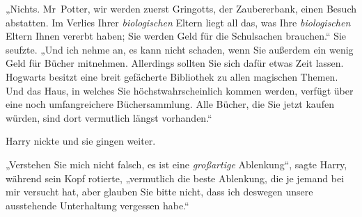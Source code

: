 „Nichts. Mr~Potter, wir werden zuerst Gringotts, der Zaubererbank, einen Besuch abstatten. Im Verlies Ihrer \emph{biologischen} Eltern liegt all das, was Ihre \emph{biologischen} Eltern Ihnen vererbt haben; Sie werden Geld für die Schulsachen brauchen.“ Sie seufzte.
„Und ich nehme an, es kann nicht schaden, wenn Sie außerdem ein wenig Geld für Bücher mitnehmen. Allerdings sollten Sie sich dafür etwas Zeit lassen. Hogwarts besitzt eine breit gefächerte Bibliothek zu allen magischen Themen. Und das Haus, in welches Sie höchstwahrscheinlich kommen werden, verfügt über eine noch umfangreichere Büchersammlung. Alle Bücher, die Sie jetzt kaufen würden, sind dort vermutlich längst vorhanden.“

Harry nickte und sie gingen weiter.

„Verstehen Sie mich nicht falsch, es ist eine \emph{großartige} Ablenkung“, sagte Harry, während sein Kopf rotierte, „vermutlich die beste Ablenkung, die je jemand bei mir versucht hat, aber glauben Sie bitte nicht, dass ich deswegen unsere ausstehende Unterhaltung vergessen habe.“

